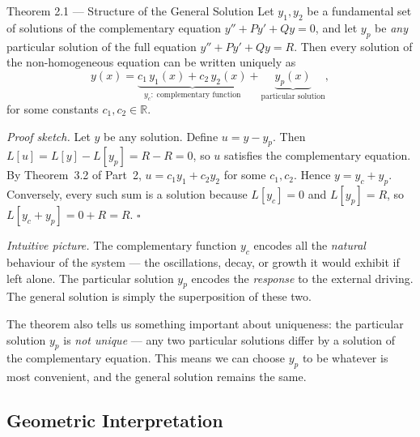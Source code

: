 \documentclass[12pt,a4paper]{article}
\newcommand{\R}{\mathbb{R}}
\newenvironment{insight_plain}{%
  \vspace{0.4em}\begin{list}{}{\leftmargin=1em}\item\small\itshape\color{gray!70!black}%
}{\end{list}\vspace{0.4em}}
\begin{document}
\begin{theorembox}{Theorem 2.1 --- Structure of the General Solution}
Let $y_1, y_2$ be a fundamental set of solutions of the complementary equation
$y'' + Py' + Qy = 0$, and let $y_p$ be \emph{any} particular solution of the full
equation $y'' + Py' + Qy = R$. Then every solution of the non-homogeneous equation
can be written uniquely as
\[
  y(x) = \underbrace{c_1\,y_1(x) + c_2\,y_2(x)}_{y_c:\;\text{complementary function}}
          + \underbrace{y_p(x)}_{\text{particular solution}},
\]
for some constants $c_1, c_2 \in \R$.
\end{theorembox}

\textit{Proof sketch.} Let $y$ be any solution. Define $u = y - y_p$. Then
$L[u] = L[y] - L[y_p] = R - R = 0$, so $u$ satisfies the complementary equation.
By Theorem~3.2 of Part~2, $u = c_1 y_1 + c_2 y_2$ for some $c_1, c_2$. Hence
$y = y_c + y_p$. Conversely, every such sum is a solution because $L[y_c] = 0$ and
$L[y_p] = R$, so $L[y_c + y_p] = 0 + R = R$. $\square$

\begin{insight_plain}
\textit{Intuitive picture.} The complementary function $y_c$ encodes all the
\emph{natural} behaviour of the system --- the oscillations, decay, or growth it
would exhibit if left alone. The particular solution $y_p$ encodes the
\emph{response} to the external driving. The general solution is simply the
superposition of these two.
\end{insight_plain}

The theorem also tells us something important about uniqueness: the particular
solution $y_p$ is \emph{not unique} --- any two particular solutions differ by a
solution of the complementary equation. This means we can choose $y_p$ to be
whatever is most convenient, and the general solution remains the same.

\subsection{Geometric Interpretation}
\end{document}
